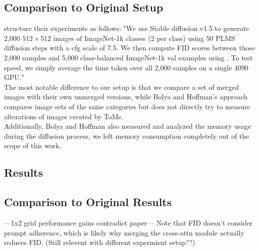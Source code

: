 \subsection{Comparison to Original Setup}
\cite{bolya2023tomesd} structure their experiments as follows: "We use Stable diffusion v1.5 to generate 2,000 $512 \times 512$ images of ImageNet-1k \cite{deng2009imagenet} classes (2 per class) using 50 PLMS \cite{liu2022pseudo} diffusion steps with a cfg scale \cite{dhariwal2021diffusion} of 7.5. We then compute FID scores between those 2,000 samples and 5,000 class-balanced ImageNet-1k val examples using \cite{Seitzer2020FID}. To test speed, we simply average the time taken over all 2,000 samples on a single 4090 GPU."\\
The most notable difference to our setup is that we compare a set of merged images with their own unmerged versions, while Bolya and Hoffman's approach compares image sets of the same categories but does not directly try to measure alterations of images created by ToMe.\\
Additionally, Bolya and Hoffman also measured and analyzed the memory usage during the diffusion process, we left memory consumption completely out of the scope of this work.



\subsection{Results}




\newpage
\subsection{Comparison to Original Results}
---1x2 grid performance gains contradict paper---
Note that FID doesn’t consider prompt adherence, which is likely why merging the cross-attn module actually reduces FID. (Still relevent with different expermient setup??)